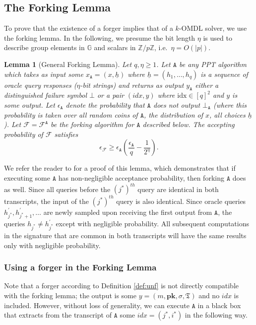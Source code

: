\documentclass{article}
\theoremstyle{plain}
\newtheorem{lemma}{Lemma}[section]
\theoremstyle{definition}
\begin{document}
\subsection{The Forking Lemma} To prove that the existence of a forger implies that of a $k$-OMDL solver, we use the forking lemma. In the following, we presume the bit length $\eta$ is used to describe group elements in $\mathbb{G}$ and scalars in $\mathbb{Z}/p\mathbb{Z}$, i.e.\ $\eta = O(\left|p\right|)$.

\begin{lemma}[General Forking Lemma]\label{lem:fork}
Let $q, \eta \geq 1$. Let $\texttt{A}$ be any PPT algorithm which takes as input some $x_\texttt{A} = (x, \underline{h})$ where $\underline{h} = (h_1, \ldots, h_q)$ is a sequence of oracle query responses ($\eta$-bit strings) and returns as output $y_{\texttt{A}}$ either a distinguished failure symbol $\bot$ or a pair $(\textit{idx}, y)$ where $\text{idx} \in [q]^2$ and $y$ is some output. Let $\epsilon_{\texttt{A}}$ denote the probability that $\texttt{A}$ does not output $\bot_{\texttt{A}}$ (where this probability is taken over all random coins of $\texttt{A}$, the distribution of $x$, all choices $\underline{h}$). Let $\mathcal{F} = \mathcal{F}^{\texttt{A}}$ be the forking algorithm for $\texttt{A}$ described below. The accepting probability of $\mathcal{F}$ satisfies \[\epsilon_{\mathcal{F}} \geq \epsilon_{\texttt{A}} \left(\frac{\epsilon_{\texttt{A}}}{q} - \frac{1}{2^\eta}\right).\]
\end{lemma}

We refer the reader to \cite{bellare} for a proof of this lemma, which demonstrates that if executing some $\texttt{A}$ has non-negligible acceptance probability, then forking $\texttt{A}$ does as well. Since all queries before the $(j^*)^{th}$ query are identical in both transcripts, the input of the $(j^*)^{th}$ query is also identical. Since oracle queries $h_{j^*}^{\prime}, h_{j^*+1}^{\prime}, \ldots$ are newly sampled upon receiving the first output from $\texttt{A}$, the queries $h_{j^*} \neq h_{j^*}^\prime$ except with negligible probability. All subsequent computations in the signature that are common in both transcripts will have the same results only with negligible probability. 


\subsubsection{Using a forger in the Forking Lemma}

Note that a forger according to Definition \ref{def:unf} is not directly compatible with the forking lemma; the output is some $y = (m, \textbf{pk}, \sigma, \mathfrak{T})$ and no $\textit{idx}$ is included.  However, without loss of generality, we can execute $\texttt{A}$ in a black box that extracts from the transcript of $\texttt{A}$ some $\textit{idx} = (j^*, i^*)$ in the following way. 
\end{document}
